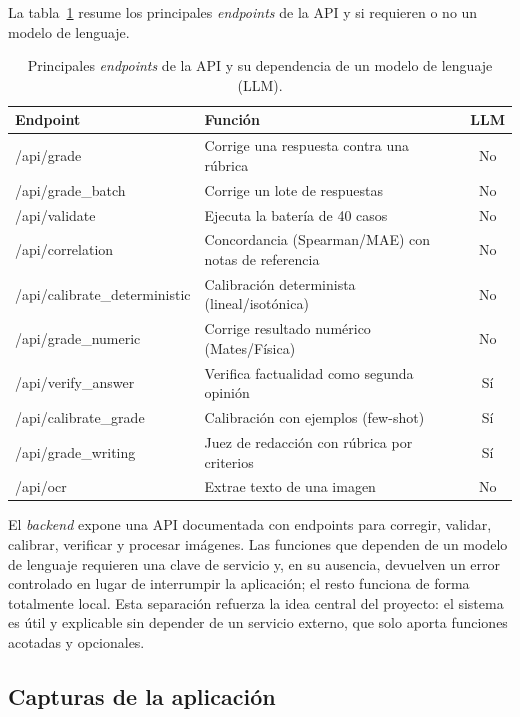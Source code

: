 La tabla~\ref{tab:endpoints} resume los principales \emph{endpoints} de la API y si requieren o no un modelo de lenguaje.

\begin{table}[ht]
\centering
\caption{Principales \emph{endpoints} de la API y su dependencia de un modelo de lenguaje (LLM).}
\label{tab:endpoints}
\small
\begin{tabularx}{\textwidth}{>{\ttfamily}l >{\raggedright\arraybackslash}X c}
\toprule
\normalfont Endpoint & Función & LLM \\
\midrule
/api/grade & Corrige una respuesta contra una rúbrica & No \\
/api/grade\_batch & Corrige un lote de respuestas & No \\
/api/validate & Ejecuta la batería de 40 casos & No \\
/api/correlation & Concordancia (Spearman/MAE) con notas de referencia & No \\
/api/calibrate\_deterministic & Calibración determinista (lineal/isotónica) & No \\
/api/grade\_numeric & Corrige resultado numérico (Mates/Física) & No \\
/api/verify\_answer & Verifica factualidad como segunda opinión & Sí \\
/api/calibrate\_grade & Calibración con ejemplos (few-shot) & Sí \\
/api/grade\_writing & Juez de redacción con rúbrica por criterios & Sí \\
/api/ocr & Extrae texto de una imagen & No \\
\bottomrule
\end{tabularx}
\end{table}

El \emph{backend} expone una API documentada con endpoints para corregir, validar, calibrar, verificar y procesar imágenes. Las funciones que dependen de un modelo de lenguaje requieren una clave de servicio y, en su ausencia, devuelven un error controlado en lugar de interrumpir la aplicación; el resto funciona de forma totalmente local. Esta separación refuerza la idea central del proyecto: el sistema es útil y explicable sin depender de un servicio externo, que solo aporta funciones acotadas y opcionales.

\subsection{Capturas de la aplicación}

